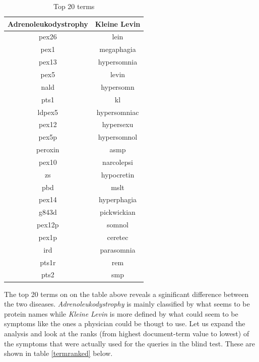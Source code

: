 \begin{table}[H]
\begin{tiny}
\caption{Top 20 terms}
\label{toptermtable}
 \begin{center}
  \begin{tabular}{|c|c|}
    \hline
    \scriptsize{\textbf{Adrenoleukodystrophy}} & \scriptsize{\textbf{Kleine Levin}} \\
\hline
    pex26 &lein  \\
\hline
    pex1 &megaphagia \\
\hline
    pex13 &hypersomnia\\
\hline
    pex5 &levin\\
\hline
    nald &hypersomn\\
\hline
    pts1 &kl\\
\hline
    ldpex5 &hypersomniac\\
\hline
    pex12 &hypersexu \\
\hline
    pex5p &hypersomnol\\
\hline
    peroxin&asmp \\
\hline
    pex10 &narcolepsi\\
\hline
    zs &hypocretin\\
\hline
    pbd &mslt \\
\hline
    pex14 &hyperphagia\\
\hline
    g843d &pickwickian \\
\hline
    pex12p &somnol\\
\hline
    pex1p &ceretec\\
\hline
    ird &parasomnia\\
\hline
    pts1r &rem\\
\hline
    pts2 &smp\\
    \hline
    \end{tabular}
\end{center}
\end{tiny}
\end{table}

The top 20 terms on on the table above reveals a sginificant difference between the two diseases.
\textit{Adrenoleukodystrophy} is mainly classified by what seems to be protein names while 
\textit{Kleine Levin} is more defined by what could seem to be symptoms like the ones a physician
could be thougt to use. Let us expand the analysis and look at the ranks (from highest document-term value to lowest) 
of the symptoms that were actually used for the queries in the blind test. These are shown in table \ref{termranked} below.

